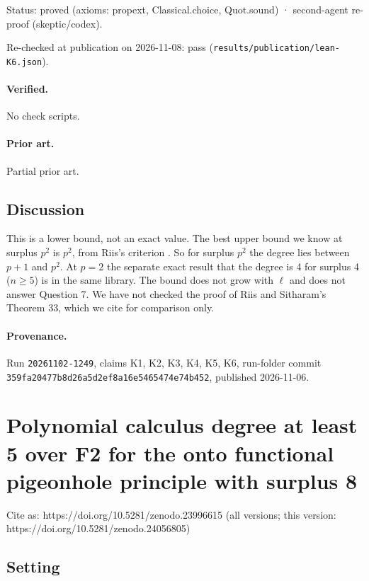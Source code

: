 \documentclass{article}
\begin{document}
Status: proved (axioms: propext, Classical.choice, Quot.sound) · second-agent re-proof (skeptic/codex).

Re-checked at publication on 2026-11-08: pass (\texttt{results/publication/lean-K6.json}).

\paragraph{Verified.}
No check scripts.

\paragraph{Prior art.} Partial prior art.

\subsection*{Discussion}

This is a lower bound, not an exact value. The best upper bound we know at surplus $p^2$ is $p^2$,
from Riis's criterion \cite{riis1993independence,razborov2001php}. So for surplus $p^2$ the degree
lies between $p+1$ and $p^2$. At $p=2$ the separate exact result that the degree is 4 for surplus 4
($n\ge5$) is in the same library. The bound does not grow with $\ell$ and does not answer
Question 7. We have not checked the proof of Riis and Sitharam's Theorem 33, which we cite for
comparison only.

\paragraph{Provenance.}
Run \texttt{20261102-1249}, claims K1, K2, K3, K4, K5, K6, run-folder commit \texttt{359fa20477b8d26a5d2ef8a16e5465474e74b452}, published 2026-11-06.

\section{Polynomial calculus degree at least 5 over F2 for the onto functional pigeonhole principle with surplus 8}
\label{sec:pc-degree-5-onto-fphp-surplus-8}

Cite as: https://doi.org/10.5281/zenodo.23996615 (all versions; this version: https://doi.org/10.5281/zenodo.24056805)

\subsection*{Setting}
\end{document}
